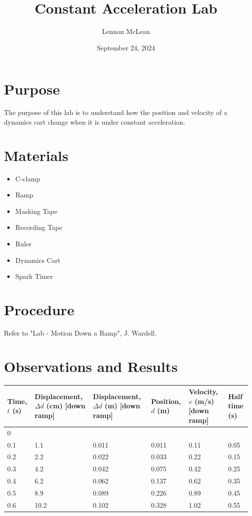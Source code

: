 \documentclass{article}
\title{Constant Acceleration Lab}
\author{Lennon McLean}
\date{September 24, 2024}
\begin{document}
\maketitle

\section*{Purpose}
The purpose of this lab is to understand how the position and velocity of a dynamics cart change when it is under constant acceleration.

\section*{Materials}
\begin{itemize}
    \item C-clamp
    \item Ramp
    \item Masking Tape
    \item Recording Tape
    \item Ruler
    \item Dynamics Cart
    \item Spark Timer
\end{itemize}

\section*{Procedure}
Refer to "Lab - Motion Down a Ramp", J. Wardell.

\section*{Observations and Results}
\hspace*{-3cm}
\begin{tabular}{|p{2cm}|p{3cm}|p{3cm}|p{3cm}|p{3cm}|p{2cm}|}
    \hline
    Time, $t$ (s) & Displacement, $\Delta d$ (cm) [down ramp] & Displacement, $\Delta d$ (m) [down ramp] & Position, $d$ (m) & Velocity, $v$ (m/s) [down ramp] & Half time (s) \\ \hline
    0 &  &  &  &  &  \\ \hline
    0.1 & 1.1 & 0.011 & 0.011 & 0.11 & 0.05 \\ \hline
    0.2 & 2.2 & 0.022 & 0.033 & 0.22 & 0.15 \\ \hline
    0.3 & 4.2 & 0.042 & 0.075 & 0.42 & 0.25 \\ \hline
    0.4 & 6.2 & 0.062 & 0.137 & 0.62 & 0.35 \\ \hline
    0.5 & 8.9 & 0.089 & 0.226 & 0.89 & 0.45 \\ \hline
    0.6 & 10.2 & 0.102 & 0.328 & 1.02 & 0.55 \\ \hline
\end{tabular}
\end{document}
